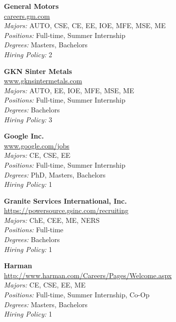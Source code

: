 \documentclass{article}
\begin{document}
\begin{center}
\begin{multicols}{3}
\begin{minipage}{.9\columnwidth}{\Large\bf General Motors }\\
	\url{careers.gm.com}\\
	\emph{Majors:} AUTO, CSE, CE, EE, IOE, MFE, MSE, ME\\
	\emph{Positions:} Full-time, Summer Internship\\
	\emph{Degrees:} Masters, Bachelors\\
	\emph{Hiring Policy:} 2\\
\end{minipage}
 
\begin{minipage}{.9\columnwidth}{\Large\bf GKN Sinter Metals }\\
	\url{www.gknsintermetals.com}\\
	\emph{Majors:} AUTO, EE, IOE, MFE, MSE, ME\\
	\emph{Positions:} Full-time, Summer Internship\\
	\emph{Degrees:} Bachelors\\
	\emph{Hiring Policy:} 3\\
\end{minipage}
 
\begin{minipage}{.9\columnwidth}{\Large\bf Google Inc. }\\
	\url{www.google.com/jobs}\\
	\emph{Majors:} CE, CSE, EE\\
	\emph{Positions:} Full-time, Summer Internship\\
	\emph{Degrees:} PhD, Masters, Bachelors\\
	\emph{Hiring Policy:} 1\\
\end{minipage}
 
\begin{minipage}{.9\columnwidth}{\Large\bf Granite Services International, Inc. }\\
	\url{https://powersource.gsinc.com/recruiting}\\
	\emph{Majors:} ChE, CEE, ME, NERS\\
	\emph{Positions:} Full-time\\
	\emph{Degrees:} Bachelors\\
	\emph{Hiring Policy:} 1\\
\end{minipage}
 
\begin{minipage}{.9\columnwidth}{\Large\bf Harman }\\
	\url{http://www.harman.com/Careers/Pages/Welcome.aspx}\\
	\emph{Majors:} CE, CSE, EE, ME\\
	\emph{Positions:} Full-time, Summer Internship, Co-Op\\
	\emph{Degrees:} Masters, Bachelors\\
	\emph{Hiring Policy:} 1\\
\end{minipage}
 

\end{multicols}
\end{center}
\end{document}
